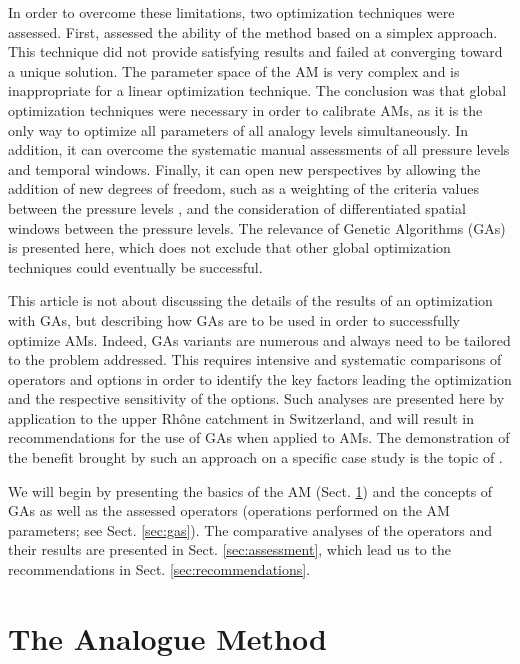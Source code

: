 \documentclass{ametsoc}
\begin{document}
In order to overcome these limitations, two optimization techniques were assessed. First, \citet{Horton2012a} assessed the ability of the \citet{Nelder1965a} method based on a simplex approach. This technique did not provide satisfying results and failed at converging toward a unique solution. The parameter space of the AM is very complex and is inappropriate for a linear optimization technique. The conclusion was that global optimization techniques were necessary in order to calibrate AMs, as it is the only way to optimize all parameters of all analogy levels simultaneously. In addition, it can overcome the systematic manual assessments of all pressure levels and temporal windows. Finally, it can open new perspectives by allowing the addition of new degrees of freedom, such as a weighting of the criteria values between the pressure levels \citep[see][]{Horton2016b}, and the consideration of differentiated spatial windows between the pressure levels. The relevance of Genetic Algorithms (GAs) is presented here, which does not exclude that other global optimization techniques could eventually be successful. 

This article is not about discussing the details of the results of an optimization with GAs, but describing how GAs are to be used in order to successfully optimize AMs. Indeed, GAs variants are numerous and always need to be tailored to the problem addressed. This requires intensive and systematic comparisons of operators and options in order to identify the key factors leading the optimization and the respective sensitivity of the options. Such analyses are presented here by application to the upper Rh\^{o}ne catchment in Switzerland, and will result in recommendations for the use of GAs when applied to AMs. The demonstration of the benefit brought by such an approach on a specific case study is the topic of \citet{Horton2016b}. 

We will begin by presenting the basics of the AM (Sect. \ref{sec:am}) and the concepts of GAs as well as the assessed operators (operations performed on the AM parameters; see Sect. \ref{sec:gas}). The comparative analyses of the operators and their results are presented in Sect. \ref{sec:assessment}, which lead us to the recommendations in Sect. \ref{sec:recommendations}.


\section{The Analogue Method}
\label{sec:am}
\end{document}
